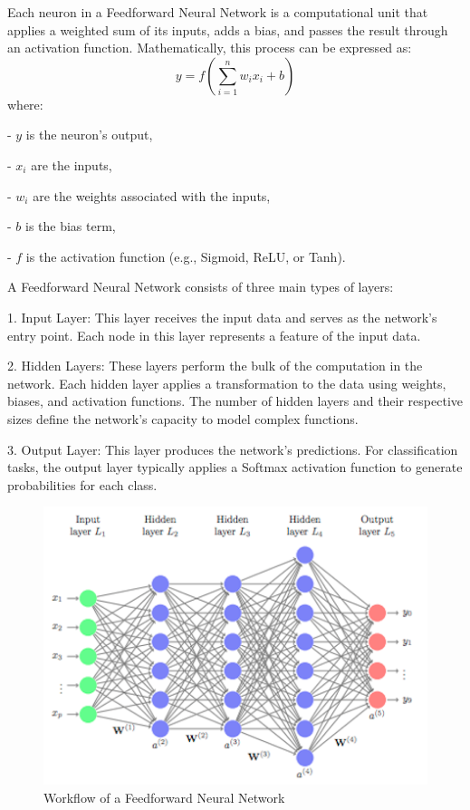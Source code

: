 Each neuron in a Feedforward Neural Network is a computational unit that applies a weighted sum of its inputs, adds a bias, and passes the result through an activation function. Mathematically, this process can be expressed as:
\[
y = f\left(\sum_{i=1}^{n} w_i x_i + b\right)
\]
where:

- \(y\) is the neuron's output,

- \(x_i\) are the inputs,

- \(w_i\) are the weights associated with the inputs,

- \(b\) is the bias term,

- \(f\) is the activation function (e.g., Sigmoid, ReLU, or Tanh).


A Feedforward Neural Network consists of three main types of layers:

1. Input Layer: This layer receives the input data and serves as the network's entry point. Each node in this layer represents a feature of the input data.

2. Hidden Layers: These layers perform the bulk of the computation in the network. Each hidden layer applies a transformation to the data using weights, biases, and activation functions. The number of hidden layers and their respective sizes define the network's capacity to model complex functions.

3. Output Layer: This layer produces the network's predictions. For classification tasks, the output layer typically applies a Softmax activation function to generate probabilities for each class.

\begin{figure}[h!]
    \centering
    \includegraphics[width=1\linewidth]{images/feedforward_workflow.png}
    \caption{Workflow of a Feedforward Neural Network}
    \label{fig:feedforward_workflow}
\end{figure}

